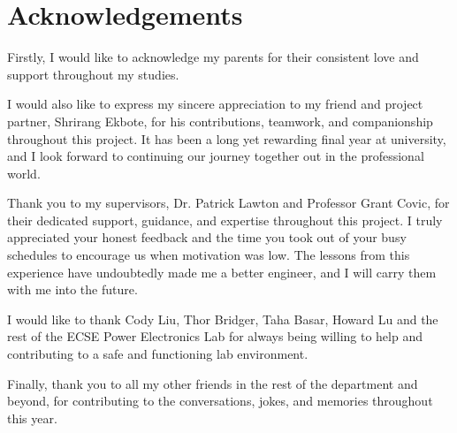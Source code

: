 \chapter*{Acknowledgements}
\begingroup
\setlength{\parindent}{0pt}
\setlength{\parskip}{9pt}

Firstly, I would like to acknowledge my parents for their consistent love and support throughout my studies.

I would also like to express my sincere appreciation to my friend and project partner, Shrirang Ekbote, for his contributions, teamwork, and companionship throughout this project. It has been a long yet rewarding final year at university, and I look forward to continuing our journey together out in the professional world.

Thank you to my supervisors, Dr. Patrick Lawton and Professor Grant Covic, for their dedicated support, guidance, and expertise throughout this project. I truly appreciated your honest feedback and the time you took out of your busy schedules to encourage us when motivation was low. The lessons from this experience have undoubtedly made me a better engineer, and I will carry them with me into the future.

I would like to thank Cody Liu, Thor Bridger, Taha Basar, Howard Lu and the rest of the ECSE Power Electronics Lab for always being willing to help and contributing to a safe and functioning lab environment. 

Finally, thank you to all my other friends in the rest of the department and beyond, for contributing to the conversations, jokes, and memories throughout this year.

\endgroup
